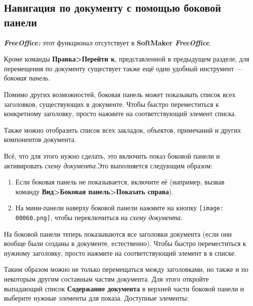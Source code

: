 ﻿\documentclass[a4paper,10pt]{article}
\begin{document}
\subsection{Навигация по документу с помощью боковой панели} \label{sec:навигдокспомбоковпан}

\begin{mdframed}[backgroundcolor=pink!50]
\textbf{\textit{FreeOffice:}} этот функционал отсутствует в \textbf{SoftMaker \textit{FreeOffice}}.
\end{mdframed}

Кроме команды \textbf{Правка>Перейти к}, представленной в предыдущем разделе, для перемещения по документу существует также ещё один удобный инструмент — \textit{боковая панель}.

Помимо других возможностей, боковая панель может показывать список всех заголовков, существующих в документе. Чтобы быстро переместиться к конкретному заголовку, просто нажмите на соответствующий элемент списка.

Также можно отобразить список всех закладок, объектов, примечаний и других компонентов документа.

Всё, что для этого нужно сделать, это включить показ боковой панели и активировать \textit{схему документа}.Это выполняется следующим образом:

\begin{enumerate}
 \item Если боковая панель не показывается, включите её (например, вызвав команду \textbf{Вид>Боковая панель>Показать справа}).
 \item На мини-панели наверху боковой панели нажмите на кнопку \texttt{[image: 00060.png]}, чтобы переключиться на \textit{схему документа}.
\end{enumerate}

На боковой панели теперь показываются все заголовки документа (если они вообще были созданы в документе, естественно). Чтобы быстро переместиться к нужному заголовку, просто нажмите на соответствующий элемент в в списке.

Таким образом можно не только перемещаться между заголовками, но также и по некоторым другим составным частям документа. Для этого откройте выпадающий список \textbf{Содержание документа} в верхней части боковой панели и выберите нужные элементы для показа. Доступные элементы:
\end{document}
